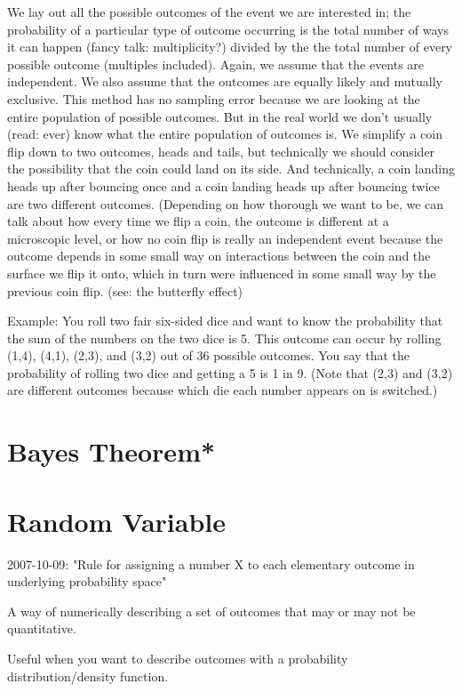 \documentclass{article}
\begin{document}
We lay out all the possible outcomes of the event we are interested in; the probability of a particular type of outcome occurring is the total number of ways it can happen (fancy talk: multiplicity?) divided by the the total number of every possible outcome (multiples included).  Again, we assume that the events are independent. We also assume that the outcomes are equally likely and mutually exclusive. This method has no sampling error because we are looking at the entire population of possible outcomes.  But in the real world we don't usually (read: ever) know what the entire population of outcomes is.  We simplify a coin flip down to two outcomes, heads and tails, but technically we should consider the possibility that the coin could land on its side.  And technically, a coin landing heads up after bouncing once and a coin landing heads up after bouncing twice are two different outcomes.  (Depending on how thorough we want to be, we can talk about how every time we flip a coin, the outcome is different at a microscopic level, or how no coin flip is really an independent event because the outcome depends in some small way on interactions between the coin and the surface we flip it onto, which in turn were influenced in some small way by the previous coin flip. (see:  the butterfly effect)


Example:  You roll two fair six-sided dice and want to know the probability that the sum of the numbers on the two dice is 5.  This outcome can occur by rolling (1,4), (4,1), (2,3), and (3,2) out of 36 possible outcomes.  You say that the probability of rolling two dice and getting a 5 is 1 in 9.  (Note that (2,3) and (3,2) are different outcomes because which die each number appears on is switched.)


\section{Bayes Theorem*}


\section{Random Variable}

2007-10-09: "Rule for assigning a number X to each elementary outcome in underlying probability space"

A way of numerically describing a set of outcomes that may or may not be quantitative.

Useful when you want to describe outcomes with a probability distribution/density function.
\end{document}
